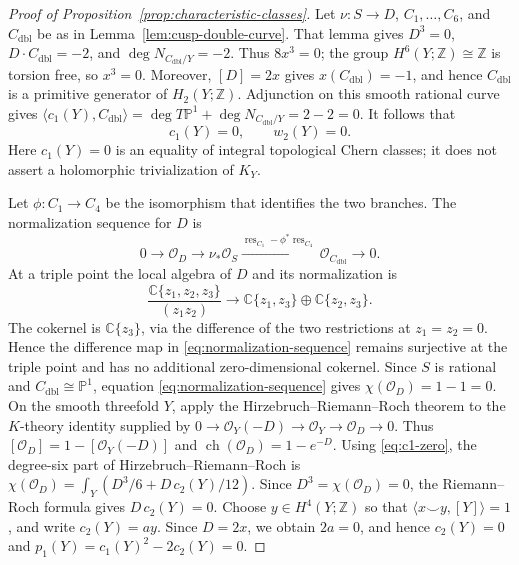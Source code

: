 \begin{proof}[Proof of Proposition~\ref{prop:characteristic-classes}]
Let $\nu:S\to D$, $C_1,\ldots,C_6$, and
$C_{\mathrm{dbl}}$ be as in Lemma~\ref{lem:cusp-double-curve}.  That lemma
gives $D^3=0$, $D\cdot C_{\mathrm{dbl}}=-2$, and
$\deg N_{C_{\mathrm{dbl}}/Y}=-2$.
Thus $8x^3=0$; the group $H^6(Y;\mathbb Z)\cong\mathbb Z$ is
torsion free, so $x^3=0$.  Moreover,
$[D]=2x$ gives $x(C_{\mathrm{dbl}})=-1$, and hence
$C_{\mathrm{dbl}}$ is a primitive generator of
$H_2(Y;\mathbb Z)$.  Adjunction on this smooth rational curve gives
$\langle c_1(Y),C_{\mathrm{dbl}}\rangle
=\deg T\mathbb P^1+\deg N_{C_{\mathrm{dbl}}/Y}=2-2=0$.
It follows that
\begin{equation}\label{eq:c1-zero}
 c_1(Y)=0,\qquad w_2(Y)=0.
\end{equation}
Here $c_1(Y)=0$ is an equality of integral topological Chern classes; it
does not assert a holomorphic trivialization of $K_Y$.

Let $\phi:C_1\to C_4$ be the isomorphism that identifies the two branches.
The normalization sequence for $D$ is
\begin{equation}\label{eq:normalization-sequence}
 0\longrightarrow\mathcal O_D
 \longrightarrow\nu_*\mathcal O_S
 \xrightarrow{\operatorname{res}_{C_1}
  -\phi^*\operatorname{res}_{C_4}}
 \mathcal O_{C_{\mathrm{dbl}}}\longrightarrow0.
\end{equation}
At a triple point the local algebra of $D$ and its normalization is
\[
 \frac{\mathbb C\{z_1,z_2,z_3\}}{(z_1z_2)}
 \longrightarrow
 \mathbb C\{z_1,z_3\}\oplus\mathbb C\{z_2,z_3\}.
\]
The cokernel is $\mathbb C\{z_3\}$, via the difference of the two
restrictions at $z_1=z_2=0$.  Hence the difference map in
\eqref{eq:normalization-sequence} remains surjective at the triple point and
has no additional zero-dimensional cokernel.  Since $S$ is
rational and $C_{\mathrm{dbl}}\cong\mathbb P^1$, equation
\eqref{eq:normalization-sequence} gives $\chi(\mathcal O_D)=1-1=0$.
On the smooth threefold $Y$, apply the Hirzebruch--Riemann--Roch theorem
to the $K$-theory identity supplied by
$0\to\mathcal O_Y(-D)\to\mathcal O_Y\to\mathcal O_D\to0$.
Thus $[\mathcal O_D]=1-[\mathcal O_Y(-D)]$ and
$\operatorname{ch}(\mathcal O_D)=1-e^{-D}$.  Using
\eqref{eq:c1-zero}, the degree-six part of Hirzebruch--Riemann--Roch is
$\chi(\mathcal O_D)
=\int_Y(D^3/6+D\,c_2(Y)/12)$.
Since $D^3=\chi(\mathcal O_D)=0$, the Riemann--Roch formula gives
$D\,c_2(Y)=0$.  Choose $y\in H^4(Y;\mathbb Z)$ so that
$\langle x\smile y,[Y]\rangle=1$, and write
$c_2(Y)=ay$.  Since $D=2x$, we obtain $2a=0$, and hence
$c_2(Y)=0$ and $p_1(Y)=c_1(Y)^2-2c_2(Y)=0$.
\end{proof}

